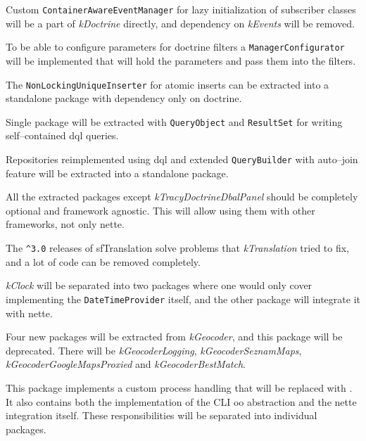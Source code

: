 Custom \lstinline{ContainerAwareEventManager} for lazy initialization of subscriber classes will be a part of \textit{\gls{kDoctrine}} directly, and dependency on \textit{\gls{kEvents}} will be removed.

To be able to configure parameters for \gls{doctrine} filters a \lstinline{ManagerConfigurator} will be implemented that will hold the parameters and pass them into the filters.

The \lstinline{NonLockingUniqueInserter} for atomic inserts can be extracted into a standalone package with dependency only on \gls{doctrine}.

Single package will be extracted with \lstinline{QueryObject} and \lstinline{ResultSet} for writing self--contained \gls{dql} queries.

Repositories reimplemented using \gls{dql} and extended \lstinline{QueryBuilder} with auto--join feature will be extracted into a standalone package.

All the extracted packages except \textit{\gls{kTracyDoctrineDbalPanel}} should be completely optional and framework agnostic. This will allow using them with other frameworks, not only \gls{nette}.


The \lstinline{^3.0} releases of \gls{sfTranslation} solve problems that \textit{\gls{kTranslation}} tried to fix, and a lot of code can be removed completely.


\textit{\gls{kClock}} will be separated into two packages where one would only cover implementing the \lstinline{DateTimeProvider} itself, and the other package will integrate it with \gls{nette}.


Four new packages will be extracted from \textit{\gls{kGeocoder}}, and this package will be deprecated. There will be \textit{\gls{kGeocoderLogging}}, \textit{\gls{kGeocoderSeznamMaps}}, \textit{\gls{kGeocoderGoogleMapsProxied}} and \textit{\gls{kGeocoderBestMatch}}.


This package implements a custom process handling that will be replaced with . It also contains both the implementation of the CLI \gls{oo} abstraction and the \gls{nette} integration itself. These responsibilities will be separated into individual packages.
